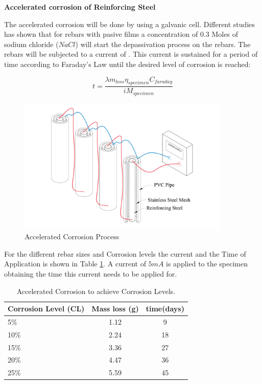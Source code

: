 \textbf{Accelerated corrosion  of Reinforcing Steel}

The accelerated corrosion will be done by using a galvanic cell. Different studies \cite{Ghods2010} has shown that for rebars with pasive films a concentration of 0.3 Moles of sodium chloride ($NaCl$) will start the depassivation process on the rebars. The rebars will be subjected to a current of . This current is sustained for a period of time according to Faraday's Law until the desired level of corrosion is reached:

\begin{equation}
	t=\frac{\lambda m_{loss} \eta_{specimen} C_{faraday}}{i M_{specimen}}
	\label{eq.FaradayEq}
\end{equation}

\begin{figure}[htbp]
	\centering
	\includegraphics[width=0.9\textwidth]{Chapter-4/figs/AcceleratedCorrosionProcedure}
	\caption{Accelerated Corrosion Process}
	\label{fig:AcceleratedCorrosion}
\end{figure}

For the different rebar sizes and Corrosion levels the current and the Time of Application is shown in Table \ref{tab:AcceleratedCorrosionTime}. A current of $5 mA$ is applied to the specimen obtaining the time this current needs to be applied for.

\begin{table}[htbp]
	\caption{Accelerated Corrosion to achieve Corrosion Levels.}
	\label{tab:AcceleratedCorrosionTime}
	\centering	
		\begin{tabular}{|l|c|c|}
		\hline
		Corrosion Level (CL) & Mass loss (g)   & time(days)     \\  \hline	
		5\%                  & 1.12            & 9  \\  \hline	
		10\%                 & 2.24            & 18 \\  \hline	
		15\%                 & 3.36            & 27 \\  \hline	
		20\%                 & 4.47            & 36 \\  \hline	
		25\%                 & 5.59            & 45 \\  \hline	
		\end{tabular}
\end{table}


